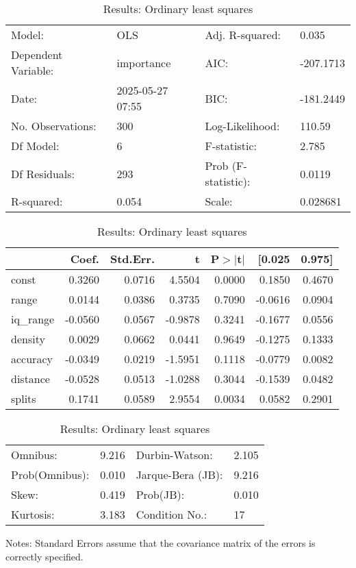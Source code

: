 \begin{table}
\caption{Results: Ordinary least squares}
\label{}
\begin{center}
\begin{tabular}{llll}
\hline
Model:              & OLS              & Adj. R-squared:     & 0.035      \\
Dependent Variable: & importance       & AIC:                & -207.1713  \\
Date:               & 2025-05-27 07:55 & BIC:                & -181.2449  \\
No. Observations:   & 300              & Log-Likelihood:     & 110.59     \\
Df Model:           & 6                & F-statistic:        & 2.785      \\
Df Residuals:       & 293              & Prob (F-statistic): & 0.0119     \\
R-squared:          & 0.054            & Scale:              & 0.028681   \\
\hline
\end{tabular}
\end{center}

\begin{center}
\begin{tabular}{lrrrrrr}
\hline
          &   Coef. & Std.Err. &       t & P$> |$t$|$ &  [0.025 & 0.975]  \\
\hline
const     &  0.3260 &   0.0716 &  4.5504 &      0.0000 &  0.1850 & 0.4670  \\
range     &  0.0144 &   0.0386 &  0.3735 &      0.7090 & -0.0616 & 0.0904  \\
iq\_range & -0.0560 &   0.0567 & -0.9878 &      0.3241 & -0.1677 & 0.0556  \\
density   &  0.0029 &   0.0662 &  0.0441 &      0.9649 & -0.1275 & 0.1333  \\
accuracy  & -0.0349 &   0.0219 & -1.5951 &      0.1118 & -0.0779 & 0.0082  \\
distance  & -0.0528 &   0.0513 & -1.0288 &      0.3044 & -0.1539 & 0.0482  \\
splits    &  0.1741 &   0.0589 &  2.9554 &      0.0034 &  0.0582 & 0.2901  \\
\hline
\end{tabular}
\end{center}

\begin{center}
\begin{tabular}{llll}
\hline
Omnibus:       & 9.216 & Durbin-Watson:    & 2.105  \\
Prob(Omnibus): & 0.010 & Jarque-Bera (JB): & 9.216  \\
Skew:          & 0.419 & Prob(JB):         & 0.010  \\
Kurtosis:      & 3.183 & Condition No.:    & 17     \\
\hline
\end{tabular}
\end{center}
\end{table}
\bigskip
Notes: \newline 
[1] Standard Errors assume that the covariance matrix of the errors is correctly specified.